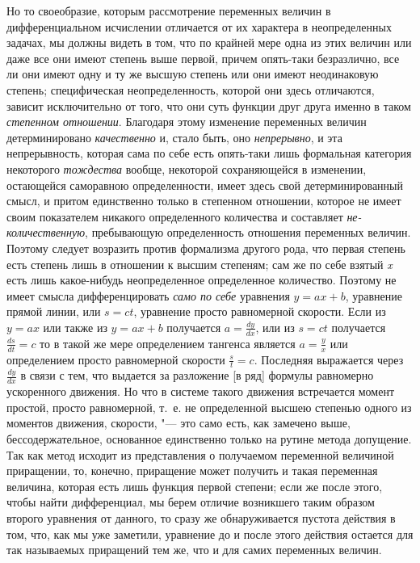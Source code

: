 \label{bkm:bm53c}Но то своеобразие, которым рассмотрение переменных величин в дифференциальном
исчислении отличается от их характера в неопределенных задачах, мы должны
видеть в том, что по крайней мере одна из этих величин или даже все они
имеют степень выше первой, причем опять-таки безразлично, все ли они имеют
одну и ту же высшую степень или они имеют неодинаковую степень;
специфическая неопределенность, которой они здесь отличаются, зависит
исключительно от того, что они суть функции друг друга именно в таком
{\em степенном отношении}. Благодаря этому изменение
переменных величин детерминировано {\em качественно} и,
стало быть, оно {\em непрерывно}, и эта непрерывность,
которая сама по себе есть опять-таки лишь формальная категория некоторого
{\em тождества} вообще, некоторой сохраняющейся в
изменении, остающейся саморавною определенности, имеет здесь свой
детерминированный смысл, и притом единственно только в степенном отношении,
которое не имеет своим показателем никакого определенного количества и
составляет {\em не-количественную}, пребывающую
определенность отношения переменных величин. Поэтому следует возразить
против формализма другого рода, что первая степень есть степень лишь в
отношении к высшим степеням; сам же по себе взятый
{\em x} есть лишь какое-нибудь неопределенное
определенное количество. Поэтому не имеет смысла дифференцировать
{\em само по себе} уравнения $y=ax+b$,
уравнение прямой линии, или $s=ct$, уравнение просто равномерной
скорости. Если из $y=ax$ или также из $y=ax+b$
получается $a=\frac{dy}{dx}$, или из $s=ct$
получается $\frac{ds}{dt}=c$ то в такой же мере
определением тангенса является $a=\frac y x$ или определением просто
равномерной скорости $\frac s t=c$. Последняя выражается через
$\frac{dy}{dx}$ в связи с тем, что выдается за
разложение [в ряд] формулы равномерно ускоренного движения. Но что в
системе такого движения встречается момент простой, просто
равномерной, т.~е. не определенной высшею степенью одного из моментов
движения, скорости, "--- это само есть, как замечено выше, бессодержательное,
основанное единственно только на рутине метода допущение. Так как метод
исходит из представления о получаемом переменной величиной приращении, то,
конечно, приращение может получить и такая переменная величина, которая
есть лишь функция первой степени; если же после этого, чтобы найти
дифференциал, мы берем отличие возникшего таким образом второго уравнения от
данного, то сразу же обнаруживается пустота действия в том, что, как мы уже
заметили, уравнение до и после этого действия остается для так называемых
приращений тем же, что и для самих переменных величин.

